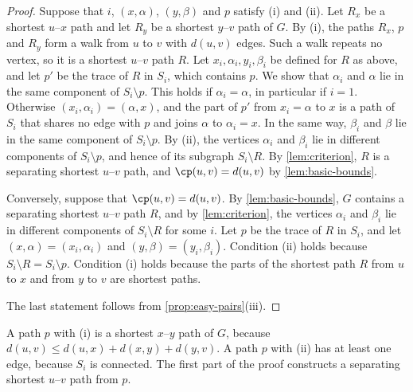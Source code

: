 \begin{proof}
Suppose that $i$, $(x, \alpha)$, $(y, \beta)$ and $p$ satisfy (i) and (ii).
Let $R_x$ be a shortest $u$--$x$ path and let $R_y$ be a shortest $y$--$v$ path of $G$.
By (i), the paths $R_x$, $p$ and $R_y$ form a walk from $u$ to $v$ with $d(u, v)$ edges.
Such a walk repeats no vertex, so it is a shortest $u$--$v$ path $R$.
Let $x_i, \alpha_i, y_i, \beta_i$ be defined for $R$ as above, and let $p'$ be the trace of $R$ in $S_i$, which contains $p$.
We show that $\alpha_i$ and $\alpha$ lie in the same component of $S_i \setminus p$.
This holds if $\alpha_i = \alpha$, in particular if $i = 1$.
Otherwise $(x_i, \alpha_i) = (\alpha, x)$, and the part of $p'$ from $x_i = \alpha$ to $x$ is a path of $S_i$ that shares no edge with $p$ and joins $\alpha$ to $\alpha_i = x$.
In the same way, $\beta_i$ and $\beta$ lie in the same component of $S_i \setminus p$.
By (ii), the vertices $\alpha_i$ and $\beta_i$ lie in different components of $S_i \setminus p$, and hence of its subgraph $S_i \setminus R$.
By \cref{lem:criterion}, $R$ is a separating shortest $u$--$v$ path, and $\cp(u, v) = d(u, v)$ by \cref{lem:basic-bounds}.

Conversely, suppose that $\cp(u, v) = d(u, v)$.
By \cref{lem:basic-bounds}, $G$ contains a separating shortest $u$--$v$ path $R$, and by \cref{lem:criterion}, the vertices $\alpha_i$ and $\beta_i$ lie in different components of $S_i \setminus R$ for some $i$.
Let $p$ be the trace of $R$ in $S_i$, and let $(x, \alpha) = (x_i, \alpha_i)$ and $(y, \beta) = (y_i, \beta_i)$.
Condition (ii) holds because $S_i \setminus R = S_i \setminus p$.
Condition (i) holds because the parts of the shortest path $R$ from $u$ to $x$ and from $y$ to $v$ are shortest paths.

The last statement follows from \cref{prop:easy-pairs}(iii).
\end{proof}

A path $p$ with (i) is a shortest $x$--$y$ path of $G$, because $d(u, v) \leq d(u, x) + d(x, y) + d(y, v)$.
A path $p$ with (ii) has at least one edge, because $S_i$ is connected.
The first part of the proof constructs a separating shortest $u$--$v$ path from $p$.

